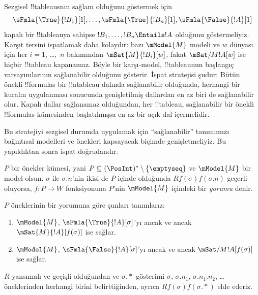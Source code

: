 



\begin{explain}
  Sezgisel !!{tableau}s{}nın sağlam olduğunu göstermek için
  \[
  \sFmla{\True}{!B_1}[1], \dots, \sFmla{\True}{!B_n}[1], \sFmla{\False}{!A}[1]
  \]
  kapalı bir !!{tableau}{}ya sahipse $!B_1, \dots, !B_n \Entails !A$ olduğunu
  göstermeliyiz. Karşıt tersini ispatlamak daha kolaydır: bazı $\mModel{M}$
  modeli ve $w$ dünyası için her $i=1$, \dots,~$n$ bakımından
  $\mSat{M}{!B_i}[w]$, fakat $\mSat/{M}{!A}[w]$ ise hiçbir !!{tableau}
  kapanamaz. Böyle bir karşı-model, !!{tableau}{}nun başlangıç varsayımlarının
  sağlanabilir olduğunu gösterir. İspat stratejisi şudur: Bütün önekli
  !!{formula}s bir !!a{tableau} dalında sağlanabilir olduğunda, herhangi bir
  kuralın uygulanması sonucunda genişletilmiş dallardan en az biri de
  sağlanabilir olur. Kapalı dallar sağlanamaz olduğundan, her !!{tableau},
  sağlanabilir bir önekli !!{formula}s kümesinden başlatılmışsa en az bir açık
  dal içermelidir.

  Bu stratejiyi sezgisel durumda uygulamak için ``sağlanabilir'' tanımımızı
  bağıntısal modelleri ve önekleri kapsayacak biçimde genişletmeliyiz. Bu
  yapıldıktan sonra ispat doğrudandır.
\end{explain}

\begin{defn}
  $P$ bir önekler kümesi, yani $P \subseteq (\PosInt)^*
  \setminus \{\emptyseq\}$ ve $\mModel{M}$ bir model olsun. $\sigma$ ile
  $\sigma.n$'nin ikisi de $P$ içinde olduğunda $Rf(\sigma)f(\sigma.n)$
  geçerli oluyorsa, $f\colon P \to W$ fonksiyonuna $P$'nin $\mModel{M}$
  içindeki bir \emph{yorumu} denir.

  $P$ öneklerinin bir yorumuna göre şunları tanımlarız:
  \begin{enumerate}
  \item $\mModel{M}$, $\sFmla{\True}{!A}[\sigma]$'yı ancak ve ancak
    $\mSat{M}{!A}[f(\sigma)]$ ise sağlar.
  \item $\mModel{M}$, $\sFmla{\False}{!A}[\sigma]$'yı ancak ve ancak
    $\mSat/{M}{!A}[f(\sigma)]$ ise sağlar.
  \end{enumerate}
\end{defn}

$R$ yansımalı ve geçişli olduğundan ve $\sigma.{*}$ gösterimi $\sigma$,
$\sigma.n_1$, $\sigma.n_1.n_2$, \dots{} öneklerinden herhangi birini
belirttiğinden, ayrıca $Rf(\sigma)f(\sigma.{*})$ elde ederiz.

